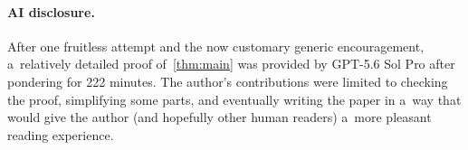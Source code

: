 \documentclass[11pt,a4paper]{article}
\begin{document}
\paragraph*{AI disclosure.}
After one fruitless attempt and the now customary generic encouragement, a~relatively detailed proof of~\cref{thm:main} was provided by GPT-5.6 Sol Pro after pondering for 222 minutes.
The author's contributions were limited to checking the proof, simplifying some parts, and eventually writing the paper in a~way that would give the author (and hopefully other human readers) a~more pleasant reading experience.  



\end{document}

